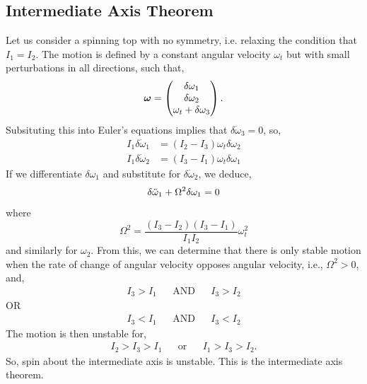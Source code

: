 \documentclass{book}
\begin{document}
\subsection{Intermediate Axis Theorem}
Let us consider a spinning top with no symmetry, i.e. relaxing the condition that $I_1 = I_2$. The motion is defined by a constant angular velocity $\omega_t$ but with small perturbations in all directions, such that,
\begin{equation}
	\vb*{\omega} = \begin{pmatrix}
		\delta \omega_1 \\ \delta \omega_2 \\ \omega_t + \delta\omega_3
	\end{pmatrix}.
\end{equation}
Subsituting this into Euler's equations implies that $\delta \Dot{\omega}_3 = 0$, so,
\begin{align}
	I_1\delta\Dot{\omega}_1 &= (I_2 - I_3)\omega_t\delta\omega_2 \\
	I_1\delta\Dot{\omega}_2 &= (I_3 - I_1)\omega_t\delta\omega_1\end{align}
If we differentiate $\delta \omega_1$ and substitute for $\delta\Dot{\omega}_2$, we deduce,
\begin{equation}
	\delta \Ddot{\omega}_1 + \Omega^2\delta\omega_1 = 0
\end{equation}
where
\begin{equation}
	\Omega^2 = \frac{(I_3 - I_2)(I_3-I_1)}{I_1I_2}\omega_t^2
\end{equation}
and similarly for $\omega_2$. From this, we can determine that there is only stable motion when the rate of change of angular velocity opposes angular velocity, i.e., $\Omega^2 > 0$, and,
\begin{align}
	I_3 > I_1 && \text{AND} && I_3 > I_2
\end{align}
OR
\begin{align}
	I_3 < I_1 && \text{AND} && I_3 < I_2
\end{align}
The motion is then unstable for,
\begin{align}
	I_2 > I_3 > I_1 && \text{or} && I_1 > I_3 > I_2.
\end{align}
So, spin about the intermediate axis is unstable. This is the intermediate axis theorem.
\newpage
\end{document}
